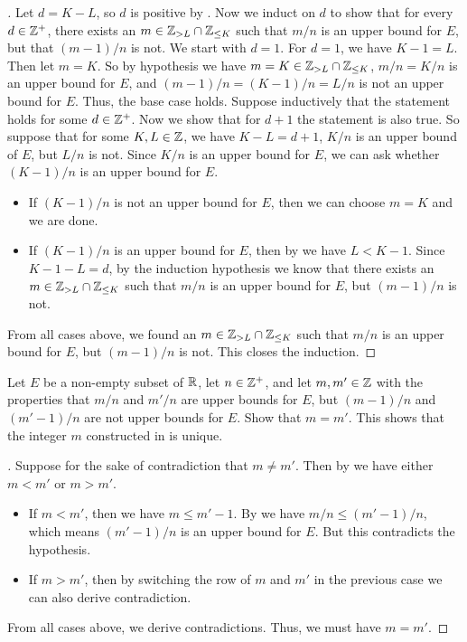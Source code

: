 \begin{proof}[]
  Let \(d = K - L\), so \(d\) is positive by .
  Now we induct on \(d\) to show that for every \(d \in \mathbb{Z}^+\), there exists an \(m \in \mathbb{Z}_{> L} \cap \mathbb{Z}_{\leq K}\) such that \(m / n\) is an upper bound for \(E\), but that \((m - 1) / n\) is not.
  We start with \(d = 1\).
  For \(d = 1\), we have \(K - 1 = L\).
  Then let \(m = K\).
  So by hypothesis we have \(m = K \in \mathbb{Z}_{> L} \cap \mathbb{Z}_{\leq K}\), \(m / n = K / n\) is an upper bound for \(E\), and \((m - 1) / n = (K - 1) / n = L / n\) is not an upper bound for \(E\).
  Thus, the base case holds.
  Suppose inductively that the statement holds for some \(d \in \mathbb{Z}^+\).
  Now we show that for \(d + 1\) the statement is also true.
  So suppose that for some \(K, L \in \mathbb{Z}\), we have \(K - L = d + 1\), \(K / n\) is an upper bound of \(E\), but \(L / n\) is not.
  Since \(K / n\) is an upper bound for \(E\), we can ask whether \((K - 1) / n\) is an upper bound for \(E\).
  \begin{itemize}
    \item If \((K - 1) / n\) is not an upper bound for \(E\), then we can choose \(m = K\) and we are done.
    \item If \((K - 1) / n\) is an upper bound for \(E\), then by  we have \(L < K - 1\).
          Since \(K - 1 - L = d\), by the induction hypothesis we know that there exists an \(m \in \mathbb{Z}_{> L} \cap \mathbb{Z}_{\leq K}\) such that \(m / n\) is an upper bound for \(E\), but \((m - 1) / n\) is not.
  \end{itemize}
  From all cases above, we found an \(m \in \mathbb{Z}_{> L} \cap \mathbb{Z}_{\leq K}\) such that \(m / n\) is an upper bound for \(E\), but \((m - 1) / n\) is not.
  This closes the induction.
\end{proof}

\begin{ex}\label{i:ex:5.5.3}
  Let \(E\) be a non-empty subset of \(\mathbb{R}\), let \(n \in \mathbb{Z}^+\), and let \(m, m' \in \mathbb{Z}\) with the properties that \(m / n\) and \(m' / n\) are upper bounds for \(E\), but \((m - 1) / n\) and \((m' - 1) / n\) are not upper bounds for \(E\).
  Show that \(m = m'\).
  This shows that the integer \(m\) constructed in  is unique.
\end{ex}

\begin{proof}[]
  Suppose for the sake of contradiction that \(m \neq m'\).
  Then by  we have either \(m < m'\) or \(m > m'\).
  \begin{itemize}
    \item If \(m < m'\), then we have \(m \leq m' - 1\).
          By  we have \(m / n \leq (m' - 1) / n\), which means \((m' - 1) / n\) is an upper bound for \(E\).
          But this contradicts the hypothesis.
    \item If \(m > m'\), then by switching the row of \(m\) and \(m'\) in the previous case we can also derive contradiction.
  \end{itemize}
  From all cases above, we derive contradictions.
  Thus, we must have \(m = m'\).
\end{proof}

